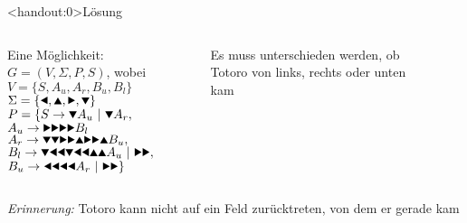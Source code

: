 {
\begin{frame}<handout:0>{Lösung}
    \begin{columns}
        \begin{alertblock}{Eine Möglichkeit:}
            $G = (V, \Sigma, P, S)$, wobei \\
            $V = \{S, A_u, A_r, B_u, B_l\}$ \\
            $\Sigma = \{\text{\Rewind}, \text{\MoveUp}, \text{\Forward}, \text{\MoveDown}\}$ \\
            $P = \{S \rightarrow \text\MoveDown A_u \ |\ \text\MoveDown A_r,$\\
            \qquad\; $A_u \rightarrow \text{\Forward\Forward\Forward\Forward} B_l$\\
            \qquad\; $A_r \rightarrow \text{\MoveDown\MoveDown\Forward\Forward\MoveUp\Forward\Forward\MoveUp} B_u,$\\
            \qquad\; $B_l \rightarrow \text{\MoveDown\Rewind\Rewind\MoveDown\Rewind\Rewind\MoveUp\MoveUp} A_u \ |\ \text{\Forward\Forward},$\\
            \qquad\; $B_u \rightarrow \text{\Rewind\Rewind\Rewind\Rewind} A_r \ |\ \text{\Forward\Forward}\}$
        \end{alertblock}
        \begin{figure}
            \centering
            \def\labyrinthVariant{DecisionPoints}
            \def\labyrinthSize{0.9\textwidth}
            
            \caption{Es muss unterschieden werden, ob Totoro von links, rechts oder unten kam}

        \end{figure}
    \end{columns}
    \small\emph{Erinnerung:} Totoro kann nicht auf ein Feld zurücktreten, von dem er gerade kam
\end{frame}
}

